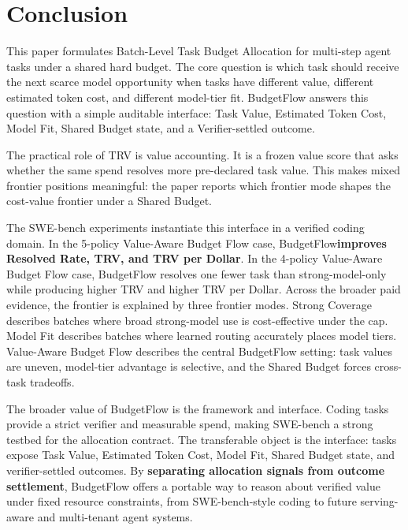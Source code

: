 \documentclass[sigconf,review,anonymous]{acmart}
\newcommand{\method}{BudgetFlow\xspace}
\newcommand{\trv}{TRV\xspace}
\newcommand{\taskvalue}{Task Value\xspace}
\newcommand{\tokencost}{Estimated Token Cost\xspace}
\newcommand{\modelfit}{Model Fit\xspace}
\newcommand{\sharedbudget}{Shared Budget\xspace}
\newcommand{\verifier}{Verifier\xspace}
\begin{document}
\section{Conclusion}
This paper formulates Batch-Level Task Budget Allocation for multi-step agent tasks under a shared hard budget. The core question is which task should receive the next scarce model opportunity when tasks have different value, different estimated token cost, and different model-tier fit. \method answers this question with a simple auditable interface: \taskvalue, \tokencost, \modelfit, \sharedbudget state, and a \verifier-settled outcome.

The practical role of \trv is value accounting. It is a frozen value score that asks whether the same spend resolves more pre-declared task value. This makes mixed frontier positions meaningful: the paper reports which frontier mode shapes the cost-value frontier under a \sharedbudget.

The SWE-bench experiments instantiate this interface in a verified coding domain. In the 5-policy Value-Aware Budget Flow case, \method \textbf{improves Resolved Rate, \trv, and \trv per Dollar}. In the 4-policy Value-Aware Budget Flow case, \method resolves one fewer task than strong-model-only while producing higher \trv and higher \trv per Dollar. Across the broader paid evidence, the frontier is explained by three frontier modes. Strong Coverage describes batches where broad strong-model use is cost-effective under the cap. Model Fit describes batches where learned routing accurately places model tiers. Value-Aware Budget Flow describes the central \method setting: task values are uneven, model-tier advantage is selective, and the \sharedbudget forces cross-task tradeoffs.

The broader value of \method is the framework and interface. Coding tasks provide a strict verifier and measurable spend, making SWE-bench a strong testbed for the allocation contract. The transferable object is the interface: tasks expose \taskvalue, \tokencost, \modelfit, \sharedbudget state, and verifier-settled outcomes. By \textbf{separating allocation signals from outcome settlement}, BudgetFlow offers a portable way to reason about verified value under fixed resource constraints, from SWE-bench-style coding to future serving-aware and multi-tenant agent systems.



\end{document}

